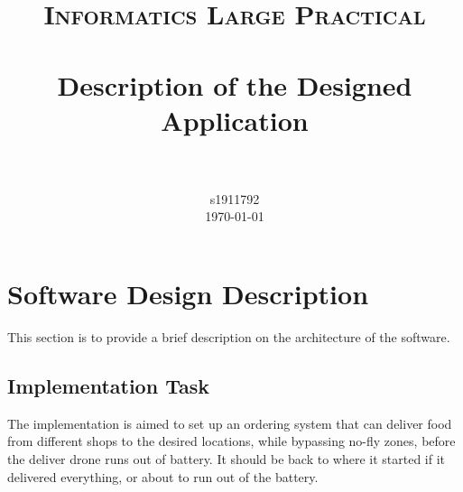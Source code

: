 \documentclass[a4paper,article,fontsize=15pt]{scrartcl}
\title{
		\usefont{OT1}{bch}{b}{n}
		\normalfont \normalsize \textsc{Informatics Large Practical} \\ [15pt]
		\horrule{0.5pt} \\[0.4cm]
		\huge Description of the Designed Application \\
		\horrule{2pt}\\[0.5cm]
}
\author{
		\normalfont\normalsize
        s1911792\\[-3pt]\normalsize
        \today
}
\date{}
\numberwithin{equation}{section}		%
\numberwithin{figure}{section}			%
\numberwithin{table}{section}				%
\begin{document}
\maketitle
\tableofcontents
\newpage
\section{Software Design Description}
This section is to provide a brief description on the architecture of the software.
\subsection{Implementation Task}
The implementation is aimed to set up an ordering system that can deliver food from different shops to the desired locations, while bypassing no-fly zones, before the deliver drone runs out of battery. It should be back to where it started if it delivered everything, or about to run out of the battery.
\end{document}
